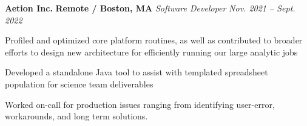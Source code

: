 \item
\headerrow
{\textbf{Aetion Inc.}}
{\textbf{Remote / Boston, MA}}
\headerrow
{\emph{Software Developer}}
{\emph{Nov. 2021 -- Sept. 2022}}
\begin{itemize*}
    \item Profiled and optimized core platform routines, as well as contributed
        to broader efforts to design new architecture for efficiently running
        our large analytic jobs
    \item Developed a standalone Java tool to assist with templated spreadsheet
        population for science team deliverables
    \item Worked on-call for production issues ranging from identifying
        user-error, workarounds, and long term solutions.
\end{itemize*}

